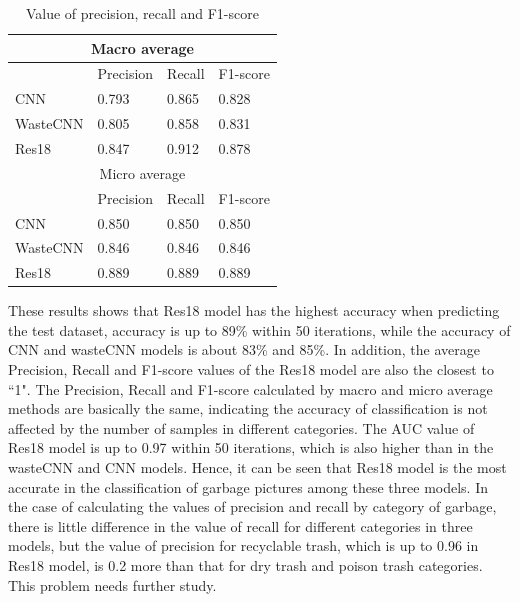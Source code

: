 \documentclass{article}
\begin{document}
\begin{table}[!h]
    \centering
    \begin{tabular}{ |p{2cm}||p{2cm}|p{2cm}|p{2cm}|  }
        \hline
            \multicolumn{4}{|c|}{Macro average} \\
        \hline
             & Precision &Recall&F1-score\\
        \hline
            CNN    &   0.793   &   0.865  &    0.828\\
            WasteCNN    &   0.805   &   0.858   &   0.831\\
            Res18   &   0.847   &   0.912   &   0.878\\
        \hline\hline
            \multicolumn{4}{|c|}{Micro average} \\
        \hline
             & Precision &Recall&F1-score\\
        \hline
            CNN    &   0.850   &   0.850  &    0.850\\
            WasteCNN    &   0.846   &   0.846   &   0.846\\
            Res18   &   0.889   &   0.889   &   0.889\\
        \hline
    \end{tabular}
    \caption{Value of precision, recall and F1-score}
    \label{tab:pre_rec_f1}
\end{table}

These results shows that Res18 model has the highest accuracy when predicting the test dataset, accuracy is up to 89\% within 50 iterations, while the accuracy of CNN and wasteCNN models is about 83\% and 85\%. In addition, the average Precision, Recall and F1-score values of the Res18 model are also the closest to ``1". The Precision, Recall and F1-score calculated by macro and micro average methods are basically the same, indicating the accuracy of classification is not affected by the number of samples in different categories. The AUC value of Res18 model is up to 0.97 within 50 iterations, which is also higher than in the wasteCNN and CNN models. Hence, it can be seen that Res18 model is the most accurate in the classification of garbage pictures among these three models.
In the case of calculating the values of precision and recall by category of garbage, there is little difference in the value of recall for different categories in three models, but the value of precision for recyclable trash, which is up to 0.96 in Res18 model, is 0.2 more than that for dry trash and poison trash categories. This problem needs further study.

\nocite{*}


\end{document}
